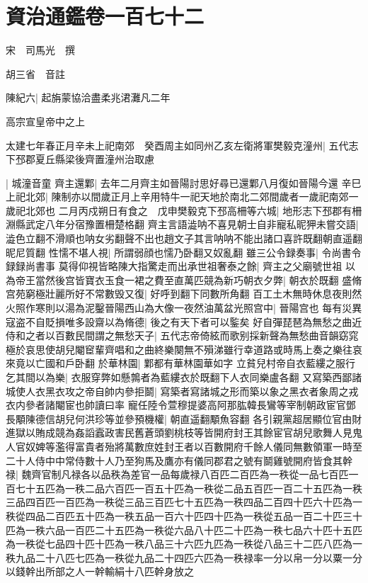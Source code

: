 \chapter{資治通鑑卷一百七十二}
宋　司馬光　撰

胡三省　音註

陳紀六|{
	起旃蒙協洽盡柔兆涒灘凡二年}


高宗宣皇帝中之上

太建七年春正月辛未上祀南郊　癸酉周主如同州乙亥左衛將軍樊毅克潼州|{
	五代志下邳郡夏丘縣梁後齊置潼州治取慮}


|{
	城潼音童}
齊主還鄴|{
	去年二月齊主如晉陽討思好尋已還鄴八月復如晉陽今還}
辛巳上祀北郊|{
	陳制亦以間歲正月上辛用特牛一祀天地於南北二郊間歲者一歲祀南郊一歲祀北郊也}
二月丙戍朔日有食之　戊申樊毅克下邳高柵等六城|{
	地形志下邳郡有柵淵縣武定八年分宿豫置柵楚格翻}
齊主言語澁呐不喜見朝士自非寵私昵狎未嘗交語|{
	澁色立翻不滑順也呐女劣翻聲不出也趙文子其言呐呐不能出諸口喜許既翻朝直遥翻昵尼質翻}
性懦不堪人視|{
	所謂弱顔也懦乃卧翻又奴亂翻}
雖三公令録奏事|{
	令尚書令録録尚書事}
莫得仰視皆略陳大指驚走而出承世祖奢泰之餘|{
	齊主之父廟號世祖}
以為帝王當然後宫皆寶衣玉食一裙之費至直萬匹競為新巧朝衣夕弊|{
	朝衣於既翻}
盛脩宫苑窮極壯麗所好不常數毁又復|{
	好呼到翻下同數所角翻}
百工土木無時休息夜則然火照作寒則以湯為泥鑿晉陽西山為大像一夜然油萬盆光照宫中|{
	晉陽宫也}
每有災異寇盗不自貶損唯多設齋以為脩德|{
	後之有天下者可以鍳矣}
好自彈琵琶為無愁之曲近侍和之者以百數民間謂之無愁天子|{
	五代志帝倚絃而歌别採新聲為無愁曲音韻窈窕極於哀思使胡兒閹䆠輩齊唱和之曲終樂闋無不殞涕雖行幸道路或時馬上奏之樂往哀來竟以亡國和戶卧翻}
於華林園|{
	鄴都有華林園華如字}
立貧兒村帝自衣藍縷之服行乞其間以為樂|{
	衣服穿弊如懸鶉者為藍縷衣於既翻下人衣同樂盧各翻}
又寫築西鄙諸城使人衣黑衣攻之帝自帥内參拒鬬|{
	寫築者寫諸城之形而築以象之黑衣者象周之戎衣内參者諸閹宦也帥讀曰率}
寵任陸令萱穆提婆高阿那肱韓長鸞等宰制朝政宦官鄧長顒陳德信胡兒何洪珍等並參預機權|{
	朝直遥翻顒魚容翻}
各引親黨超居顯位官由財進獄以賄成競為姦謟蠧政害民舊蒼頭劉桃枝等皆開府封王其餘宦官胡兒歌舞人見鬼人官奴婢等濫得富貴者殆將萬數庶姓封王者以百數開府千餘人儀同無數領軍一時至二十人侍中中常侍數十人乃至狗馬及鷹亦有儀同郡君之號有鬬雞號開府皆食其幹禄|{
	魏齊官制凡禄各以品秩為差官一品每歲禄八百匹二百匹為一秩從一品七百匹一百七十五匹為一秩二品六百匹一百五十匹為一秩從二品五百匹一百二十五匹為一秩三品四百匹一百匹為一秩從三品三百匹七十五匹為一秩四品二百四十匹六十匹為一秩從四品二百匹五十匹為一秩五品一百六十匹四十匹為一秩從五品一百二十匹三十匹為一秩六品一百匹二十五匹為一秩從六品八十匹二十匹為一秩七品六十匹十五匹為一秩從七品四十匹十匹為一秩八品三十六匹九匹為一秩從八品三十二匹八匹為一秩九品二十八匹七匹為一秩從九品二十四匹六匹為一秩禄率一分以帛一分以粟一分以錢幹出所部之人一幹輸絹十八匹幹身放之}
